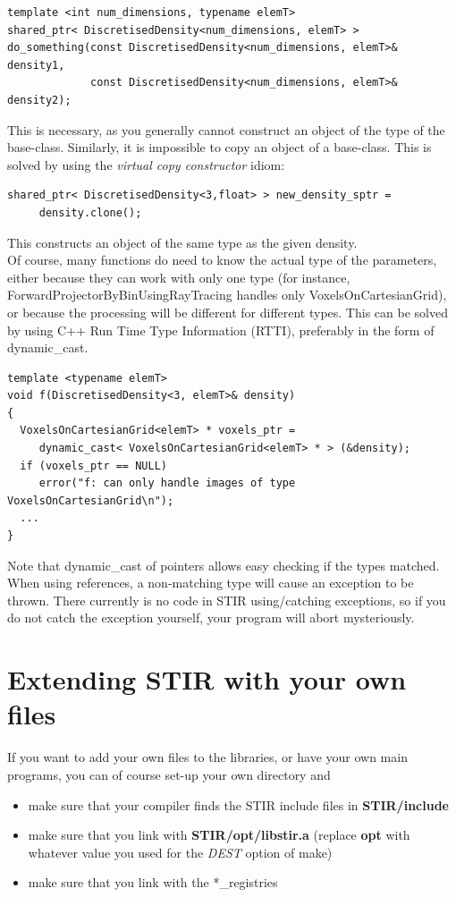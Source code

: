 \documentclass{article}
\begin{document}
\begin{verbatim}
template <int num_dimensions, typename elemT> 
shared_ptr< DiscretisedDensity<num_dimensions, elemT> >
do_something(const DiscretisedDensity<num_dimensions, elemT>& density1,
             const DiscretisedDensity<num_dimensions, elemT>& density2);
\end{verbatim}


This is necessary, as you generally cannot construct an object 
of the type of the base-class. Similarly, it is impossible to 
copy an object of a base-class. This is solved by using the \textit{virtual 
copy constructor} idiom:

\begin{verbatim}
shared_ptr< DiscretisedDensity<3,float> > new_density_sptr =
     density.clone();
\end{verbatim}

This constructs an object of the same type as the given density.\\
Of course, many functions do need to know the actual type of 
the parameters, either because they can work with only one type 
(for instance, ForwardProjectorByBinUsingRayTracing handles only 
VoxelsOnCartesianGrid), or because the processing will be different 
for different types. This can be solved by using C++ Run Time 
Type Information (RTTI), preferably in the form of dynamic\_cast.

\begin{verbatim}
template <typename elemT> 
void f(DiscretisedDensity<3, elemT>& density)
{
  VoxelsOnCartesianGrid<elemT> * voxels_ptr =
     dynamic_cast< VoxelsOnCartesianGrid<elemT> * > (&density);
  if (voxels_ptr == NULL)
     error("f: can only handle images of type VoxelsOnCartesianGrid\n");
  ...
}
\end{verbatim}


Note that dynamic\_cast of pointers allows easy checking if the 
types matched. When using references, a non-matching type will 
cause an exception to be thrown. There currently is no code in 
STIR using/catching exceptions, so if you do not catch the exception 
yourself, your program will abort mysteriously.

\section{
Extending STIR with your own files \label{sect:extendingSTIR}}

If you want to add your own files to the libraries, or have your 
own main programs, you can of course set-up your own directory 
and
\begin{itemize}
\item 
make sure that your compiler finds the STIR include files in \textbf{STIR/include}
\item 
make sure that you link with \textbf{STIR/opt/libstir.a} (replace \textbf{opt} 
with whatever value you used for the \textit{DEST} option of make)
\item 
make sure that you link with the *\_registries
\end{itemize}
\end{document}
